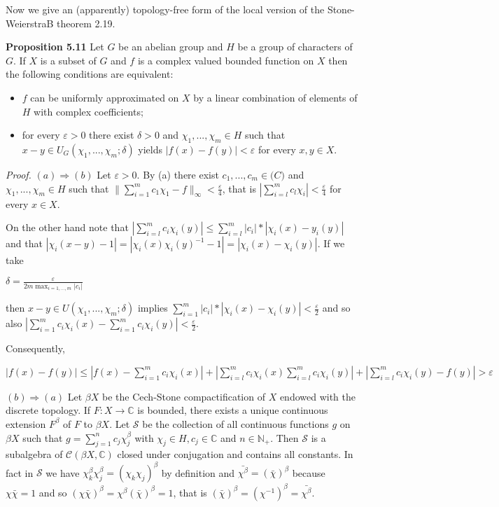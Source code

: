 \documentclass[12pt]{article}
\begin{document}
    Now we give an (apparently) topology-free form of the local version of the Stone-WeierstraB theorem 2.19.


\textbf{Proposition 5.11} Let $G$ be an abelian group and $H$ be a group of characters of $G$. If $X$ is a subset of $G$ and
$f$ is a complex valued bounded function on $X$ then the following conditions are equivalent:


\begin{itemize}

    \item $f$ can be uniformly approximated on $X$ by a linear combination of elements of $H$ with complex coefficients;

    \item  for every $\varepsilon > 0$ there exist $\delta > 0$ and $\chi_1, . . . , \chi_m \in H$ such that $x - y \in U_G(\chi_1, . . . , \chi_m; \delta)$ yields
    $|f(x) - f(y)| < \varepsilon$ for every $x, y \in X$.

\end{itemize}


\emph{Proof.} $(a) \Rightarrow (b)$ Let $\varepsilon > 0$. By (a) there exist $c_1,...,c_m \in \mathbb(C)$ and $\chi_1,...,\chi_m \in H$ such that $\|\sum^m_{i=1} c_1 \chi_1 - f\|_\infty < \frac{\varepsilon}{4}$,
that is $|\sum^m_{i=l} c_l \chi_i| < \frac{\varepsilon}{4}$ for every $x \in X$.


    On the other hand note that $|\sum^m_{i=l} c_i \chi_i (y)| \leq \sum^m_{i=l} |c_i| * |\chi_i(x)-y_i(y)|$ and that 
$|\chi_i (x-y)-1|=|\chi_i (x) \chi_i (y)^{-1} - 1|=|\chi_i(x)-\chi_i(y)|$. If we take 


    $\delta = \frac{\varepsilon}{2m \max_{i=1,...,m}|c_i|}$


    then $x-y \in U(\chi_1, . . . , \chi_m; \delta)$ implies $\sum^m_{i=1} |c_i|*|\chi_i(x)-\chi_i(y)| < \frac{\varepsilon}{2}$ and so also $|\sum^m_{i=1} c_i \chi_i(x) - \sum^m_{i=1} c_i \chi_i(y)| < \frac{\varepsilon}{2}$.


    Consequently,


    $|f(x)-f(y)| \leq |f(x)-\sum^m_{i=1}c_i \chi_i (x)| + |\sum^m_{i=l} c_i \chi_i (x) \sum^m_{i=l} c_i \chi_i (y)| + |\sum^m_{i=l}c_i \chi_i (y)-f(y)| > \varepsilon$


$(b)\Rightarrow(a)$ Let $\beta X$ be the Cech-Stone compactification of $X$ endowed with the discrete topology. If $F : X \to \mathbb{C}$ is
bounded, there exists a unique continuous extension $F^\beta$ of $F$ to $\beta X$. Let $\mathcal{S}$ be the collection of all continuous
functions $g$ on $\beta X$ such that $g = \sum^n_{j=1} c_j \chi^\beta_j$ with $\chi_j \in H, c_j \in \mathbb{C}$ and $n \in \mathbb{N}_+$. Then $\mathcal{S}$ is a subalgebra
of $\mathcal{C}(\beta X, \mathbb{C})$ closed under conjugation and contains all constants. In fact in $\mathcal{S}$ we have $\chi^\beta_k \chi^\beta_j = (\chi_k \chi_j)^\beta$ by
definition and $\bar{\chi^\beta} = (\bar{\chi})^\beta$ because $\chi \bar{\chi} = 1$ and so $(\chi \bar{\chi})^\beta = \chi^\beta(\bar{\chi})^\beta = 1$, that is $(\bar{\chi})^\beta = (\chi^{-1})^\beta = \bar{\chi^\beta}$.
\end{document}
